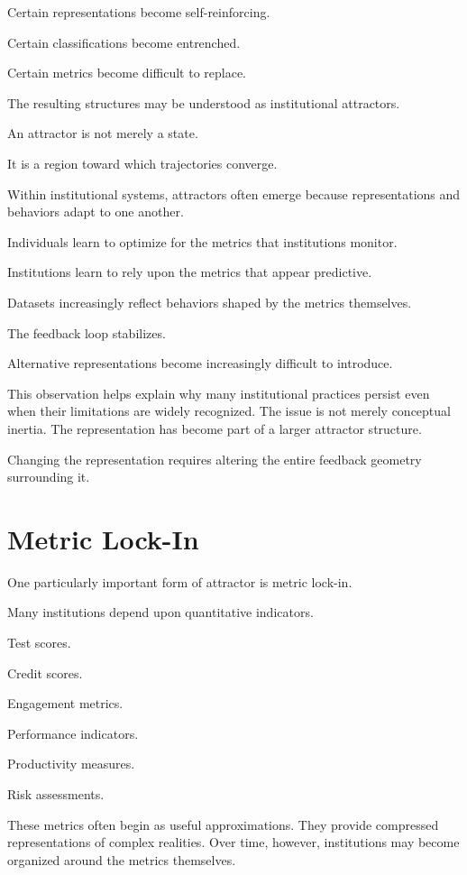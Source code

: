 \documentclass[11pt,oneside,openany]{book}
\begin{document}
Certain representations become self-reinforcing.

Certain classifications become entrenched.

Certain metrics become difficult to replace.

The resulting structures may be understood as institutional attractors.

An attractor is not merely a state.

It is a region toward which trajectories converge.

Within institutional systems, attractors often emerge because representations and behaviors adapt to one another.

Individuals learn to optimize for the metrics that institutions monitor.

Institutions learn to rely upon the metrics that appear predictive.

Datasets increasingly reflect behaviors shaped by the metrics themselves.

The feedback loop stabilizes.

Alternative representations become increasingly difficult to introduce.

This observation helps explain why many institutional practices persist even when their limitations are widely recognized. The issue is not merely conceptual inertia. The representation has become part of a larger attractor structure.

Changing the representation requires altering the entire feedback geometry surrounding it.

\section{Metric Lock-In}

One particularly important form of attractor is metric lock-in.

Many institutions depend upon quantitative indicators.

Test scores.

Credit scores.

Engagement metrics.

Performance indicators.

Productivity measures.

Risk assessments.

These metrics often begin as useful approximations. They provide compressed representations of complex realities. Over time, however, institutions may become organized around the metrics themselves.
\end{document}

